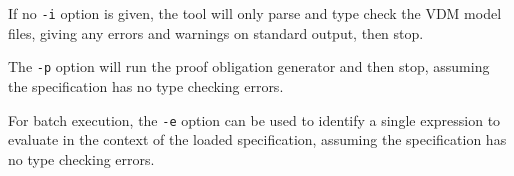 \documentclass{overturerepchap}
\begin{document}
If no \texttt{-i} option is given, the tool will only parse and type check
the VDM model files, giving any errors and warnings on
standard output, then stop. 

The \texttt{-p} option will run the proof obligation generator and
then stop, assuming the specification has no type checking errors.

For batch execution, the \texttt{-e} option can be used to identify a
single expression to evaluate in the context of the loaded
specification, assuming the specification has no type checking errors.




\lstset{style=tool,language=}


\end{document}
